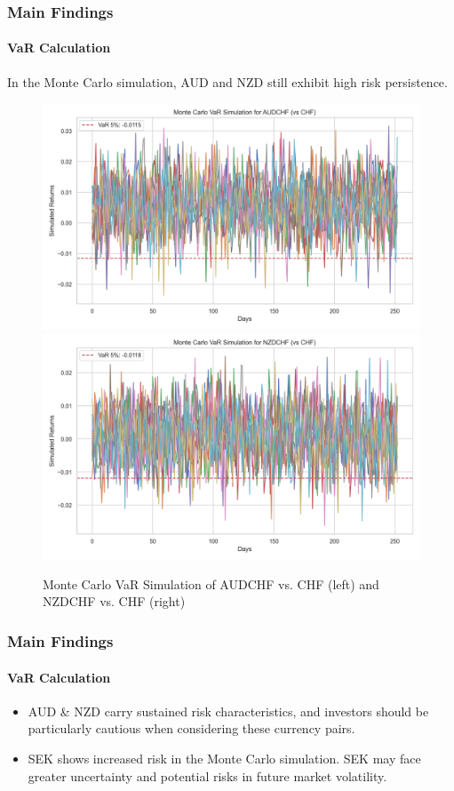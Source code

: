\documentclass[10pt]{beamer}
\begin{document}
\begin{frame}
\frametitle{Main Findings}
\framesubtitle{VaR Calculation}
In the Monte Carlo simulation, AUD and NZD still exhibit high risk persistence.

\begin{figure}[h]
    \centering   
    \includegraphics[width=0.48\linewidth]{../../reports/figures/monte_carlo_var_simulation_AUDCHF_vs_CHF.png}  \label{fig:monte_carlo_var_simulation_AUDCHF_vs_CHF}
    \includegraphics[width=0.48\linewidth]{../../reports/figures/monte_carlo_var_simulation_NZDCHF_vs_CHF.png}   \label{fig:monte_carlo_var_simulation_NZDCHF_vs_CHF}
    \caption{\footnotesize Monte Carlo VaR Simulation of AUDCHF vs. CHF (left) and NZDCHF vs. CHF (right)}  
\end{figure}
\end{frame}
\begin{frame}
\frametitle{Main Findings}
\framesubtitle{VaR Calculation}
\begin{itemize}
    \item AUD \& NZD carry sustained risk characteristics, and investors should be particularly cautious when considering these currency pairs.
    \item SEK shows increased risk in
    the Monte Carlo simulation. SEK may face greater uncertainty and potential risks in future market volatility.
\end{itemize}
\end{frame}
\end{document}
